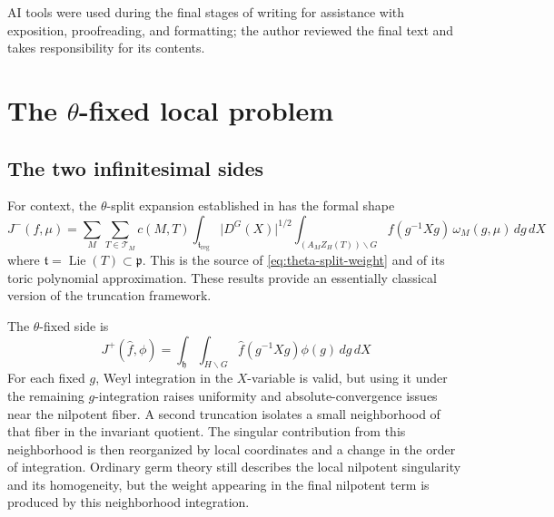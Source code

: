 \documentclass[11pt]{amsart}
\theoremstyle{definition}
\theoremstyle{remark}
\newcommand{\Lie}{\operatorname{Lie}}
\newcommand{\abs}[1]{\lvert #1\rvert}
\newcommand{\h}{\mathfrak h}
\newcommand{\p}{\mathfrak p}
\newcommand{\tT}{\mathfrak t}
\begin{document}
AI tools were used during the final stages of writing for assistance with exposition, proofreading, and formatting; the author reviewed the final text and takes responsibility for its contents.

\section{\texorpdfstring{The $\theta$-fixed local problem}{The theta-fixed local problem}}
\label{sec:weighted-origin}

\subsection{The two infinitesimal sides}
For context, the $\theta$-split expansion established in
\cite{SparlingRankOne,SparlingThetaSplit} has the formal shape
\begin{equation}\label{eq:theta-split-formal}
 J^-(f,\mu)
 =\sum_M\sum_{T\in\mathcal T_M}c(M,T)
   \int_{\tT_{\mathrm{reg}}}
   \abs{D^G(X)}^{1/2}
   \int_{(A_MZ_H(T))\backslash G}
       f(g^{-1}Xg)\,\omega_M(g,\mu)\,dg\,dX
\end{equation}
where $\tT=\Lie(T)\subset\p$.  This is the source of
\eqref{eq:theta-split-weight} and of its toric polynomial approximation.
These results provide an essentially classical version of the truncation framework.

The $\theta$-fixed side is
\begin{equation}\label{eq:theta-fixed-side}
 J^+(\widehat f,\phi)
 =\int_{\h}\int_{H\backslash G}
   \widehat f(g^{-1}Xg)\phi(g)\,dg\,dX
\end{equation}
For each fixed $g$, Weyl integration in the $X$-variable is valid, but
using it under the remaining $g$-integration raises uniformity and
absolute-convergence issues near the nilpotent fiber.  A second truncation
isolates a small neighborhood of that fiber in the invariant quotient.  The
singular contribution from this neighborhood is then reorganized by local
coordinates and a change in the order of integration.  Ordinary germ theory
still describes the local nilpotent singularity and its homogeneity, but the
weight appearing in the final nilpotent term is produced by this neighborhood
integration.
\end{document}
